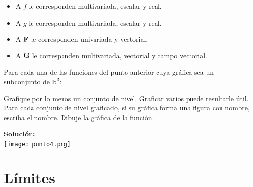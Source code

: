 \documentclass{fmbvecto}
\begin{document}
\begin{problema}
\begin{itemize}
    \item A \(f\) le corresponden multivariada, escalar y real.
    \item A \(g\) le corresponden multivariada, escalar y real.
    \item A \(\boldsymbol{{\mathbf{F}}}\) le corresponden univariada y vectorial.
    \item A \(\boldsymbol{{\mathbf{G}}}\) le corresponden multivariada, vectorial y campo vectorial.
\end{itemize}

\end{problema}

\phantom{} %

\pagebreak
\begin{problema}[Graficación]

        Para cada una de las funciones del punto anterior cuya gráfica sea un subconjunto de \(\mathbb{R}^3\):
        \begin{enumerate}[label=4.\arabic*]
            \itemp[\(0.08\bar{3}\)] Grafique por lo menos un conjunto de nivel. Graficar varios puede resultarle útil.
            \itemp[\(0.08\bar{3}\)] Para cada conjunto de nivel graficado, si su gráfica forma una figura con nombre, escriba el nombre.
            \itemp[\(0.08\bar{3}\)] Dibuje la gráfica de la función.
        \end{enumerate} 

\vspace{1em}
\tcblower
\textbf{Solución:}\\

\centering
\texttt{[image: punto4.png]}

\end{problema}


\section{Límites}
\end{document}

